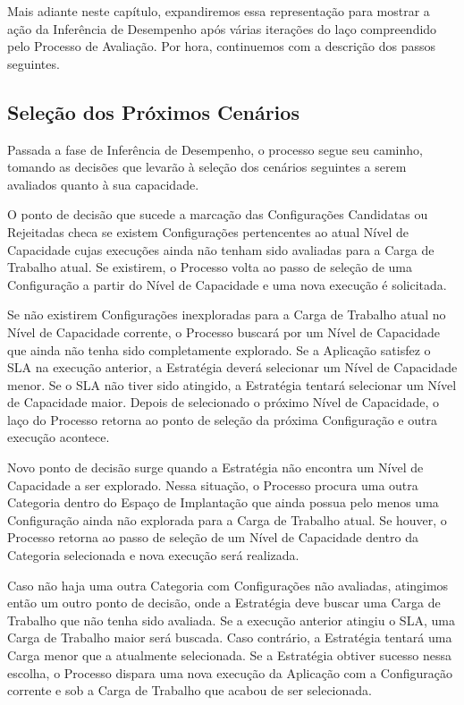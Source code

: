 Mais adiante neste capítulo, expandiremos essa representação para mostrar a ação
da Inferência de Desempenho após várias iterações do laço compreendido pelo 
Processo de Avaliação. Por hora, continuemos com a descrição dos passos seguintes.

\subsection{Seleção dos Próximos Cenários}
\label{subsec:selecao_cenarios}
Passada a fase de Inferência de Desempenho, o processo segue seu caminho, tomando
as decisões que levarão à seleção dos cenários seguintes a serem avaliados quanto
à sua capacidade.

O ponto de decisão que sucede a marcação das Configurações Candidatas ou Rejeitadas
checa se existem Configurações pertencentes ao atual Nível de Capacidade cujas 
execuções ainda não tenham sido avaliadas para a Carga de Trabalho atual. Se 
existirem, o Processo volta ao passo de seleção de uma Configuração a partir do 
Nível de Capacidade e uma nova execução é solicitada.

Se não existirem Configurações inexploradas para a Carga de Trabalho atual no
Nível de Capacidade corrente, o Processo buscará por um Nível de Capacidade que 
ainda não tenha sido completamente explorado. Se a Aplicação satisfez o SLA na 
execução anterior, a Estratégia deverá selecionar um Nível de Capacidade menor. 
Se o SLA não tiver sido atingido, a Estratégia tentará selecionar um  Nível de 
Capacidade maior. Depois de selecionado o próximo Nível de Capacidade, o laço do
Processo retorna ao ponto de seleção da próxima Configuração e outra execução 
acontece.
   
Novo ponto de decisão surge quando a Estratégia não encontra um Nível de 
Capacidade a ser explorado. Nessa situação, o Processo procura uma outra
Categoria dentro do Espaço de Implantação que ainda possua pelo menos uma
Configuração ainda não explorada para a Carga de Trabalho atual. Se houver,
o Processo retorna ao passo de seleção de um Nível de Capacidade dentro da
Categoria selecionada e nova execução será realizada.

Caso não haja uma outra Categoria com Configurações não avaliadas, atingimos
então um outro ponto de decisão, onde a Estratégia deve buscar uma Carga 
de Trabalho que não tenha sido avaliada. Se a execução anterior atingiu o SLA,
uma Carga de Trabalho maior será buscada. Caso contrário, a Estratégia tentará
uma Carga menor que a atualmente selecionada. Se a Estratégia obtiver sucesso
nessa escolha, o Processo dispara uma nova execução da Aplicação com a Configuração
corrente e sob a Carga de Trabalho que acabou de ser selecionada.

